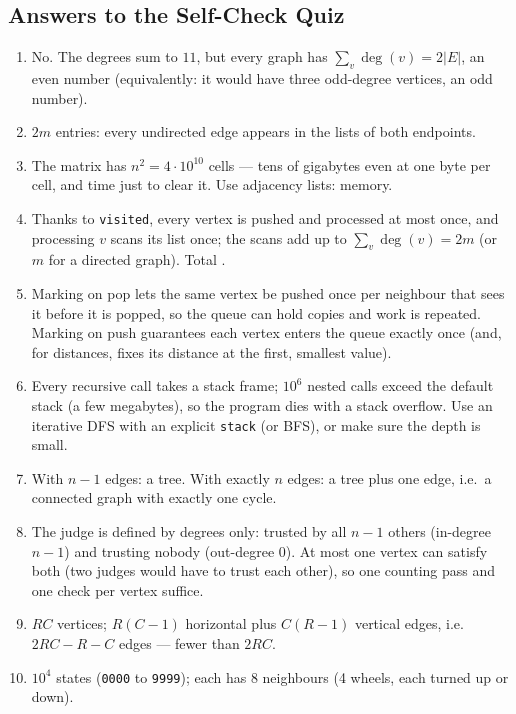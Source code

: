 \subsection{Answers to the Self-Check Quiz}
\label{ssec:ch1-quiz-answers}

\begin{solutionbox}
\begin{enumerate}[leftmargin=*]
    \item No. The degrees sum to $11$, but every graph has $\sum_v \deg(v) = 2|E|$, an even number (equivalently: it would have three odd-degree vertices, an odd number).
    \item $2m$ entries: every undirected edge appears in the lists of both endpoints.
    \item The matrix has $n^2 = 4 \cdot 10^{10}$ cells --- tens of gigabytes even at one byte per cell, and  time just to clear it. Use adjacency lists:  memory.
    \item Thanks to \texttt{visited}, every vertex is pushed and processed at most once, and processing $v$ scans its list once; the scans add up to $\sum_v \deg(v) = 2m$ (or $m$ for a directed graph). Total .
    \item Marking on pop lets the same vertex be pushed once per neighbour that sees it before it is popped, so the queue can hold  copies and work is repeated. Marking on push guarantees each vertex enters the queue exactly once (and, for distances, fixes its distance at the first, smallest value).
    \item Every recursive call takes a stack frame; $10^6$ nested calls exceed the default stack (a few megabytes), so the program dies with a stack overflow. Use an iterative DFS with an explicit \texttt{stack} (or BFS), or make sure the depth is small.
    \item With $n-1$ edges: a tree. With exactly $n$ edges: a tree plus one edge, i.e.\ a connected graph with exactly one cycle.
    \item The judge is defined by degrees only: trusted by all $n-1$ others (in-degree $n-1$) and trusting nobody (out-degree $0$). At most one vertex can satisfy both (two judges would have to trust each other), so one counting pass and one check per vertex suffice.
    \item $RC$ vertices; $R(C-1)$ horizontal plus $C(R-1)$ vertical edges, i.e.\ $2RC - R - C$ edges --- fewer than $2RC$.
    \item $10^4$ states (\texttt{0000} to \texttt{9999}); each has $8$ neighbours (4 wheels, each turned up or down).

\end{enumerate}
\end{solutionbox}
